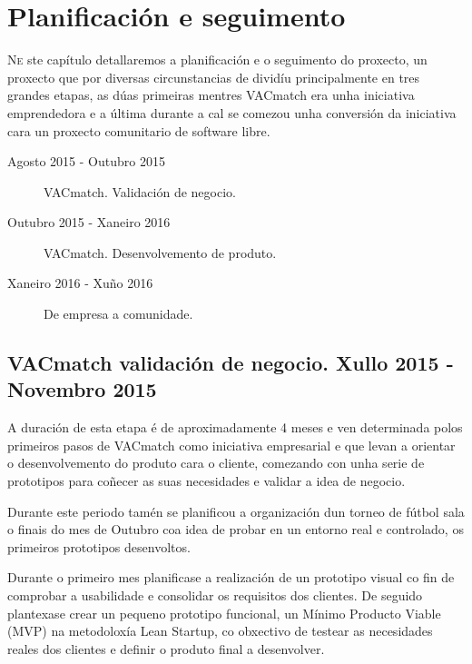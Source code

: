 \chapter{Planificación e seguimento}
\minitoc


  \lettrine{N}{e} ste capítulo detallaremos a planificación e o seguimento do 
proxecto, un proxecto que por diversas circunstancias de dividíu principalmente 
en tres grandes etapas, as dúas primeiras mentres VACmatch era unha iniciativa 
emprendedora e a última durante a cal se comezou unha conversión da iniciativa 
cara un proxecto comunitario de software libre.

  \begin{description}
    \item [Agosto 2015 - Outubro 2015] VACmatch. Validación de negocio.
    \item [Outubro 2015 - Xaneiro 2016] VACmatch. Desenvolvemento de produto.
    \item [Xaneiro 2016 - Xuño 2016] De empresa a comunidade.
  \end{description}


  \section{VACmatch validación de negocio. Xullo 2015 - Novembro 2015}
  A duración de esta etapa é de aproximadamente 4 meses e ven determinada polos 
primeiros pasos de VACmatch como iniciativa empresarial e que levan a orientar 
o desenvolvemento do produto cara o cliente, comezando con unha serie de 
prototipos para coñecer as suas necesidades e validar a idea de 
negocio.

  Durante este periodo tamén se planificou a organización dun torneo de fútbol 
sala o finais do mes de Outubro coa idea de probar en un entorno real e 
controlado, os primeiros prototipos desenvoltos.

  Durante o primeiro mes planificase a realización de un prototipo visual co 
fin de comprobar a usabilidade e consolidar os requisitos dos clientes.
  De seguido plantexase crear un pequeno prototipo funcional, un Mínimo 
Producto Viable (MVP) na metodoloxía Lean Startup, co obxectivo de testear as 
necesidades reales dos clientes e definir o produto final a desenvolver.

